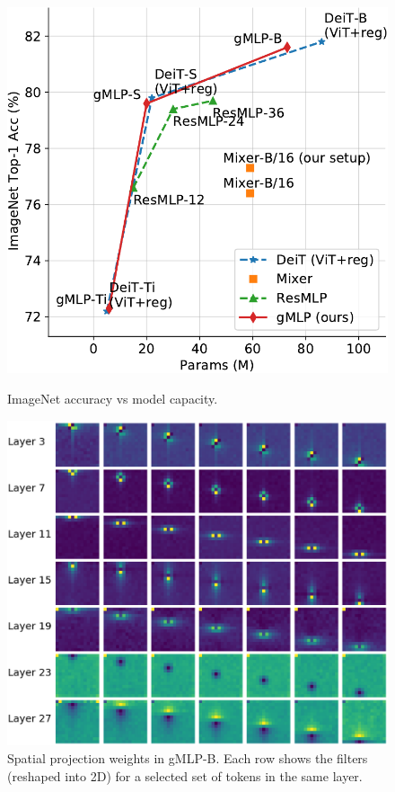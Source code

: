 \documentclass{article}
\begin{document}
\begin{figure}[h]
    \begin{minipage}{0.51\linewidth}
        \centering
        \includegraphics[width=0.94\linewidth]{figures/gffn-imagenet.pdf}
        \caption{ImageNet accuracy vs model capacity.}
        \label{fig:vision-main}
    \end{minipage}
    \hfill
    \begin{minipage}{0.475\linewidth}
        \centering
        \includegraphics[width=1.0\linewidth]{figures/vision-learned-filters.png}
    \caption{
    Spatial projection weights in gMLP-B.
    Each row shows the filters (reshaped into 2D) for a selected set of tokens in the same layer.}
    \label{fig:vision-filters}
    \end{minipage}
\end{figure}
\end{document}
